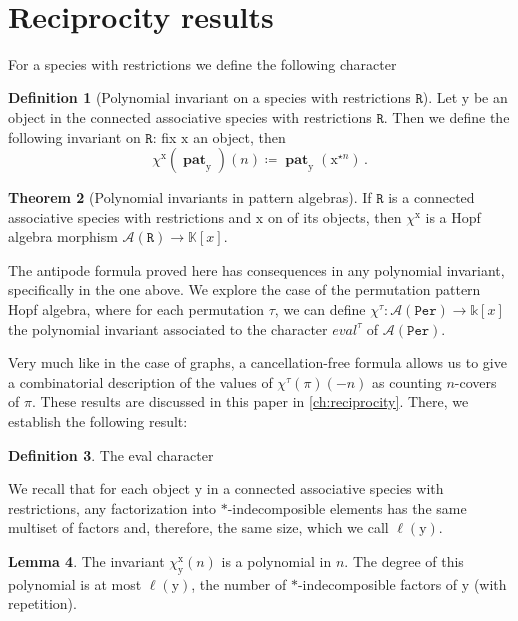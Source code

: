\documentclass[12pt, reqno]{amsart}
\theoremstyle{definition}
\newtheorem{thm}{Theorem}[section]
\newtheorem{lm}[thm]{Lemma}
\newtheorem{defin}[thm]{Definition}
\DeclareMathOperator{\pat}{\mathbf{pat}}
\newcommand{\xx}{\mathrm{x}}
\newcommand{\yy}{\mathrm{y}}
\begin{document}
\

\section{Reciprocity results\label{sec:reciprocity}}

For a species with restrictions we define the following character


\begin{defin}[Polynomial invariant on a species with restrictions $\mathtt{R}$]
Let $\mathrm{y}$ be an object in the connected associative species with restrictions $\mathtt{R}$.
Then we define the following invariant on $\mathtt{R}$: fix $\mathrm{x}$ an object, then
$$\chi^{\mathrm{x}}(\pat_{\mathrm{y}})(n) \coloneqq \pat_{\mathrm{y}}(\mathrm{x}^{\star n})\, . $$
\end{defin}


\begin{thm}[Polynomial invariants in pattern algebras]\label{thm:polynomiality}
If $\mathtt{R}$ is a connected associative species with restrictions and $\mathrm{x}$ on of its objects, then $\chi^{\mathrm{x}}$ is a Hopf algebra morphism $\mathcal A(\mathtt{R}) \to \mathbb{K}[x]$.
\end{thm}
The antipode formula proved here has consequences in any polynomial invariant, specifically in the one above.
We explore the case of the permutation pattern Hopf algebra, where for each permutation $\tau$, we can define $\chi^{\tau}: \mathcal{A}(\mathtt{Per}) \to \mathbb{k}[x]$ the polynomial invariant associated to the character $eval^{\tau}$ of $\mathcal{A}(\mathtt{Per})$.

Very much like in the case of graphs, a cancellation-free formula allows us to give a combinatorial description of the values of $\chi^{\tau}(\pi)(-n)$ as counting $n$-covers of $\pi$.
These results are discussed in this paper in \cref{ch:reciprocity}.
There, we establish the following result:



\begin{defin}\label{defin:char_specieswrest}
The eval character %
\end{defin}

We recall that for each object $\yy$ in a connected associative species with restrictions, any factorization into $\ast$-indecomposible elements has the same multiset of factors and, therefore, the same size, which we call $\ell(\yy)$.




\begin{lm}\label{lm:polynomial}
The invariant $\chi^{\xx}_{\yy}(n)$ is a polynomial in $n$.
The degree of this polynomial is at most $\ell(\yy)$, the number of $\ast$-indecomposible factors of $\yy$ (with repetition).
\end{lm}
\end{document}
